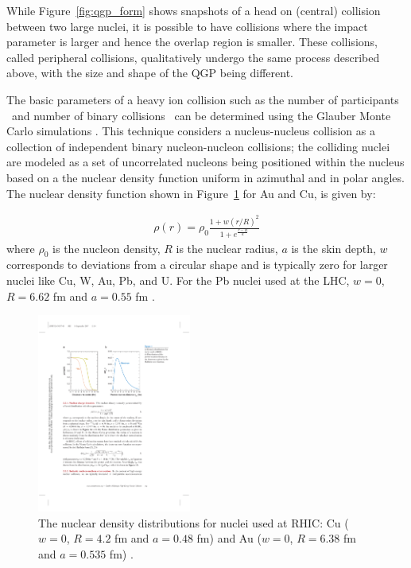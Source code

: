 While Figure~\ref{fig:qgp_form} shows snapshots of a head on (central) collision between two large nuclei, it is possible to have collisions
where the impact parameter is larger and hence the overlap region is smaller. These collisions, called peripheral collisions, qualitatively
undergo the same process described above, with the size and shape of the QGP being different.


The basic parameters of a heavy ion collision such as the number of participants \Npart\ and number of binary collisions \Ncoll\ can be
determined using the Glauber Monte Carlo simulations \cite{glauberArticle, glauberMisc}. This technique considers a nucleus-nucleus
collision as a collection of independent binary nucleon-nucleon collisions; the colliding nuclei are modeled as a set of uncorrelated
nucleons being positioned within the nucleus based on a the nuclear density function uniform in azimuthal and in polar angles. The
nuclear density function shown in Figure~\ref{fig:nuclearDensity} for Au and Cu, is given by:

\begin{align}
\rho(r) = \rho_0 \frac{1 + w (r/R)^2}{1+e^{\frac{r-R}{a}}}
\end{align}
where $\rho_0$ is the nucleon density, $R$ is the nuclear radius, $a$ is the skin depth, $w$ corresponds to deviations from a circular shape
and is typically zero for larger nuclei like Cu, W, Au, Pb, and U. For the Pb nuclei used at the LHC, $w = 0$, $R = 6.62$ fm and $a =0.55$ fm \cite{DEVRIES1987495}. 

\begin{figure}[htbp]
\begin{center}
\includegraphics[width=0.45\textwidth]{figures/theory/nuclearDensity}
\caption{ The nuclear density distributions for nuclei used at RHIC: Cu ($w = 0$, $R = 4.2$ fm and $a =0.48$ fm)  and Au ($w = 0$, $R = 6.38$ fm and $a =0.535$ fm) \cite{doi:10.1146/annurev.nucl.57.090506.123020, DEVRIES1987495}.}
\label{fig:nuclearDensity}
\end{center}
\end{figure}

